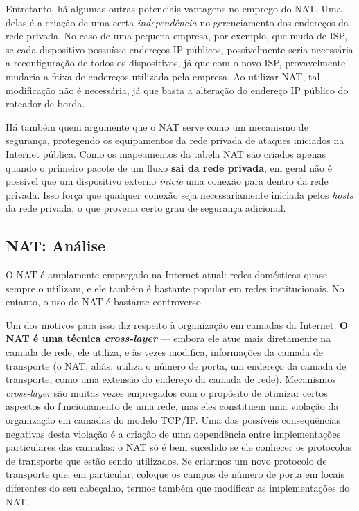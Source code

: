 \documentclass{article}
\begin{document}
Entretanto, há algumas outras potenciais vantagens no emprego do NAT. Uma delas é a criação de uma certa \textit{independência} no gerenciamento dos endereços da rede privada. No caso de uma pequena empresa, por exemplo, que muda de ISP, se cada dispositivo possuísse endereços IP públicos, possivelmente seria necessária a reconfiguração de todos os dispositivos, já que com o novo ISP, provavelmente mudaria a faixa de endereços utilizada pela empresa. Ao utilizar NAT, tal modificação não é necessária, já que basta a alteração do endereço IP público do roteador de borda.

Há também quem argumente que o NAT serve como um mecanismo de segurança, protegendo os equipamentos da rede privada de ataques iniciados na Internet pública. Como os mapeamentos da tabela NAT são criados apenas quando o primeiro pacote de um fluxo \textbf{sai da rede privada}, em geral não é possível que um dispositivo externo \textit{inicie} uma conexão para dentro da rede privada. Isso força que qualquer conexão seja necessariamente iniciada pelos \textit{hosts} da rede privada, o que proveria certo grau de segurança adicional.

\subsection{NAT: Análise}

O NAT é amplamente empregado na Internet atual: redes domésticas quase sempre o utilizam, e ele também é bastante popular em redes institucionais. No entanto, o uso do NAT é bastante controverso.

Um dos motivos para isso diz respeito à organização em camadas da Internet. \textbf{O NAT é uma técnica \textit{cross-layer}} --- embora ele atue mais diretamente na camada de rede, ele utiliza, e às vezes modifica, informações da camada de transporte (o NAT, aliás, utiliza o número de porta, um endereço da camada de transporte, como uma extensão do endereço da camada de rede). Mecanismos \textit{cross-layer} são muitas vezes empregados com o propósito de otimizar certos aspectos do funcionamento de uma rede, mas eles constituem uma violação da organização em camadas do modelo TCP/IP. Uma das possíveis consequências negativas desta violação é a criação de uma dependência entre implementações particulares das camadas: o NAT só é bem sucedido se ele conhecer os protocolos de transporte que estão sendo utilizados. Se criarmos um novo protocolo de transporte que, em particular, coloque os campos de número de porta em locais diferentes do seu cabeçalho, termos também que modificar as implementações do NAT.
\end{document}
